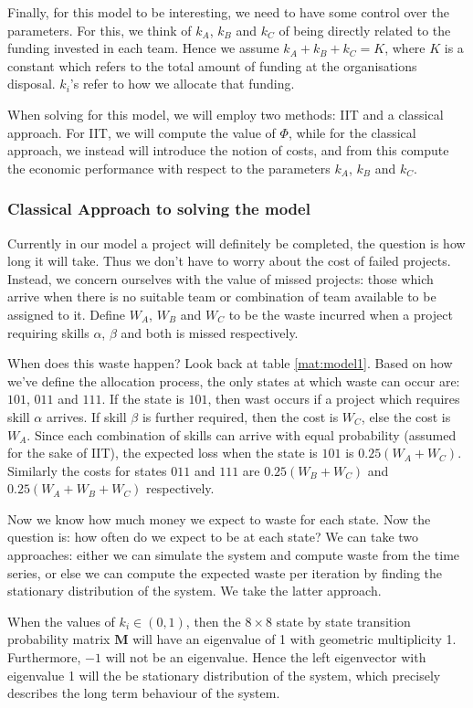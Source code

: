 Finally, for this model to be interesting, we need to have some control over the parameters. For this, we think of $k_A$, $k_B$ and $k_C$ of being directly related to the funding invested in each team. Hence we assume $k_A+k_B+k_C = K$, where $K$ is a constant which refers to the total amount of funding at the organisations disposal. $k_i$'s refer to how we allocate that funding.

When solving for this model, we will employ two methods: IIT and a classical approach. For IIT, we will compute the value of $\Phi$, while for the classical approach, we instead will introduce the notion of costs, and from this compute the economic performance with respect to the parameters $k_A$, $k_B$ and $k_C$. 

\subsubsection{Classical Approach to solving the model}
Currently in our model a project will definitely be completed, the question is how long it will take. Thus we don't have to worry about the cost of failed projects. Instead, we concern ourselves with the value of missed projects: those which arrive when there is no suitable team or combination of team available to be assigned to it. Define $W_A$, $W_B$ and $W_C$ to be the waste incurred when a project requiring skills $\alpha$, $\beta$ and both  is missed respectively.

When does this waste happen? Look back at table \ref{mat:model1}. Based on how we've define the allocation process, the only states at which waste can occur are: $101$, $011$ and $111$. If the state is $101$, then wast occurs if a project which requires skill $\alpha$ arrives. If skill $\beta$ is further required, then the cost is $W_C$, else the cost is $W_A$. Since each combination of skills can arrive with equal probability (assumed for the sake of IIT), the expected loss when the state is $101$ is $0.25(W_A+W_C)$.
Similarly the costs for states $011$ and $111$ are $0.25(W_B+W_C)$ and $0.25(W_A+W_B+W_C)$ respectively.

Now we know how much money we expect to waste for each state. Now the question is: how often do we expect to be at each state? We can take two approaches: either we can simulate the system and compute waste from the time series, or else we can compute the expected waste per iteration by finding the stationary distribution of the system. We take the latter approach.

When the values of $k_i \in (0,1)$, then the $8\times8$ state by state transition probability matrix $\mathbf{M}$ will have an eigenvalue of 1 with geometric multiplicity 1. Furthermore, $-1$ will not be an eigenvalue. Hence the left eigenvector with eigenvalue 1 will the be stationary distribution of the system, which precisely describes the long term behaviour of the system. 


